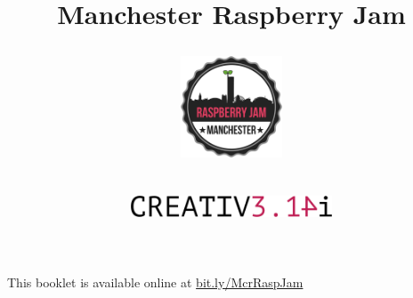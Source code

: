 \ifprint
	\title{Manchester Raspberry Jam \\ \workshopTitle}
\else
	\title{
		\begin{center}
			\includegraphics[width=30mm]{McrRaspJam/Common/logo-512}
		\end{center}
		\begin{center}
			\includegraphics[width=60mm]{McrRaspJam/014_Python/creative-pi-1024}
		\end{center}
		\vspace{12pt}
		\workshopTitle
	}
\fi

\author{}
\date{\vspace{-44pt}}
\maketitle


\ifprint
	\begin{mdframed}[rightline=false, leftline=false]
		\scriptsize
		This booklet is available online at \mbox{\href{https://drive.google.com/open?id=0B_1SFjX_5JrmfnhpX0pPRXl6bmJNal8zdUxMeWZOdjJyZVdzU3V6UnBGdlVIMENtbFFkbVk}{bit.ly/McrRaspJam}}
		\normalsize
	\end{mdframed}
\fi
